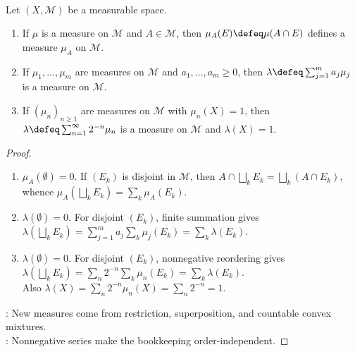 \begin{proposition} \label{prop:elementary-measure-constructions} \\
Let $(X,\mathcal{M})$ be a measurable space.
\begin{enumerate}[label=(\roman*)]
\setlength{\itemsep}{0pt}
\item If $\mu$ is a measure on $\mathcal{M}$ and $A\in\mathcal{M}$, then $\mu_A(E)\defeq\mu(A\cap E)$ defines a measure $\mu_A$ on $\mathcal{M}$.
\item If $\mu_1,\ldots,\mu_m$ are measures on $\mathcal{M}$ and $a_1,\ldots,a_m\geq0$, then $\lambda\defeq\sum_{j=1}^{m}a_j\mu_j$ is a measure on $\mathcal{M}$.
\item If $(\mu_n)_{n\geq1}$ are measures on $\mathcal{M}$ with $\mu_n(X)=1$, then $\lambda\defeq\sum_{n=1}^{\infty}2^{-n}\mu_n$ is a measure on $\mathcal{M}$ and $\lambda(X)=1$.
\end{enumerate}
\begin{proof}
\begin{enumerate}[label=(\roman*)]
\setlength{\itemsep}{0pt}
\item $\mu_A(\emptyset)=0$. If $(E_k)$ is disjoint in $\mathcal{M}$, then $A\cap\bigsqcup_kE_k=\bigsqcup_k(A\cap E_k)$, whence $\mu_A(\bigsqcup_kE_k)=\sum_k\mu_A(E_k)$.
\item $\lambda(\emptyset)=0$. For disjoint $(E_k)$, finite summation gives $\lambda(\bigsqcup_kE_k)=\sum_{j=1}^{m}a_j\sum_k\mu_j(E_k)=\sum_k\lambda(E_k)$.
\item $\lambda(\emptyset)=0$. For disjoint $(E_k)$, nonnegative reordering gives $\lambda(\bigsqcup_kE_k)=\sum_n2^{-n}\sum_k\mu_n(E_k)=\sum_k\lambda(E_k)$.\\
Also $\lambda(X)=\sum_n2^{-n}\mu_n(X)=\sum_n2^{-n}=1$.
\end{enumerate}
: New measures come from restriction, superposition, and countable convex mixtures.\\
: Nonnegative series make the bookkeeping order-independent.
\end{proof}
\end{proposition}

